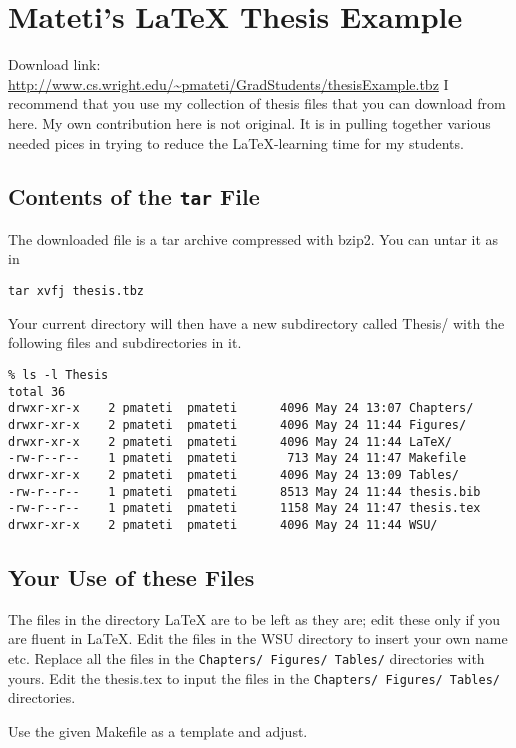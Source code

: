 \chapter{Mateti's {\LaTeX} Thesis Example}

Download link: \url{http://www.cs.wright.edu/~pmateti/GradStudents/thesisExample.tbz}
I recommend that you use my collection of thesis files that you can
download from here.  My own contribution here is not original.  It is
in pulling together various needed pices in trying to reduce the
LaTeX-learning time for my students.

\section{Contents of the {\tt tar} File}

The downloaded file is a tar archive compressed with bzip2.  You can
untar it as in

{\tt tar xvfj thesis.tbz}

Your current directory will then have a new subdirectory called
Thesis/ with the following files and subdirectories in it.

\begin{verbatim}
% ls -l Thesis
total 36
drwxr-xr-x    2 pmateti  pmateti      4096 May 24 13:07 Chapters/
drwxr-xr-x    2 pmateti  pmateti      4096 May 24 11:44 Figures/
drwxr-xr-x    2 pmateti  pmateti      4096 May 24 11:44 LaTeX/
-rw-r--r--    1 pmateti  pmateti       713 May 24 11:47 Makefile
drwxr-xr-x    2 pmateti  pmateti      4096 May 24 13:09 Tables/
-rw-r--r--    1 pmateti  pmateti      8513 May 24 11:44 thesis.bib
-rw-r--r--    1 pmateti  pmateti      1158 May 24 11:47 thesis.tex
drwxr-xr-x    2 pmateti  pmateti      4096 May 24 11:44 WSU/

\end{verbatim}

\section{Your Use of these Files}

The files in the directory LaTeX are to be left as they are; edit
these only if you are fluent in LaTeX.  Edit the files in the WSU
directory to insert your own name etc.  Replace all the files in the
{\tt Chapters/ Figures/ Tables/} directories with yours.  Edit the
thesis.tex to input the files in the {\tt Chapters/ Figures/ Tables/}
directories.

Use the given Makefile as a template and adjust.

